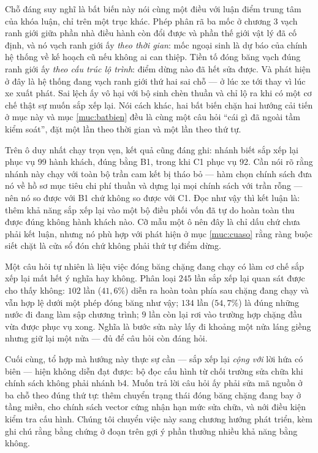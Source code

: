 Chỗ đáng suy nghĩ là bất biến này nói cùng một điều với luận điểm trung tâm của khóa luận, chỉ
trên một trục khác. Phép phân rã ba mốc ở chương 3 vạch ranh giới giữa phần nhà điều hành còn
đổi được và phần thế giới vật lý đã cố định, và nó vạch ranh giới ấy \emph{theo thời gian}: mốc
ngoại sinh là dự báo của chính hệ thống về kế hoạch cũ nếu không ai can thiệp. Tiền tố đóng băng vạch
đúng ranh giới ấy \emph{theo cấu trúc lộ trình}: điểm dừng nào đã hết sửa được. Và phát hiện ở
đây là hệ thống đang vạch ranh giới thứ hai sai chỗ --- ở lúc xe tới thay vì lúc xe xuất phát.
Sai lệch ấy vô hại với bộ sinh chèn thuần và chỉ lộ ra khi có một cơ chế thật sự muốn sắp xếp
lại. Nói cách khác, hai bất biến chặn hai hướng cải tiến ở mục này và mục \ref{muc:batbien} đều
là cùng một câu hỏi ``cái gì đã ngoài tầm kiểm soát'', đặt một lần theo thời gian và một lần
theo thứ tự.

Trên ô duy nhất chạy trọn vẹn, kết quả cũng đáng ghi: nhánh biết sắp xếp lại phục vụ 99 hành
khách, đúng bằng B1, trong khi C1 phục vụ 92. Cần nói rõ rằng nhánh này chạy với toàn bộ trần
cam kết bị tháo bỏ --- hàm chọn chính sách đưa nó về hồ sơ mục tiêu chi phí thuần và dựng lại
mọi chính sách với trần rỗng --- nên nó so được với B1 chứ không so được với C1. Đọc như vậy thì
kết luận là: thêm khả năng sắp xếp lại vào một bộ điều phối vốn đã tự do hoàn toàn thu được đúng
không hành khách nào. Cỡ mẫu một ô nên đây là chỉ dấu chứ chưa phải kết luận, nhưng nó phù hợp
với phát hiện ở mục \ref{muc:cuaso} rằng ràng buộc siết chặt là cửa sổ đón chứ không phải thứ tự
điểm dừng.

Một câu hỏi tự nhiên là liệu việc đóng băng chặng đang chạy có làm cơ chế sắp xếp lại mất hết ý
nghĩa hay không. Phân loại $245$ lần sắp xếp lại quan sát được cho thấy không: $102$ lần
($41{,}6\%$) diễn ra hoàn toàn phía sau chặng đang chạy và vẫn hợp lệ dưới một phép đóng băng
như vậy; $134$ lần ($54{,}7\%$) là đúng những nước đi đang làm sập chương trình; $9$ lần còn lại
rơi vào trường hợp chặng đầu vừa được phục vụ xong. Nghĩa là bước sửa này lấy đi khoảng một nửa
láng giềng nhưng giữ lại một nửa --- đủ để câu hỏi còn đáng hỏi.

Cuối cùng, tổ hợp mà hướng này thực sự cần --- sắp xếp lại \emph{cộng với} lời hứa có biên --- hiện
không diễn đạt được: bộ đọc cấu hình từ chối trường sửa chữa khi chính sách không phải nhánh
b4. Muốn trả lời câu hỏi ấy phải sửa mã nguồn ở ba chỗ theo đúng thứ tự: thêm chuyển trạng thái
đóng băng chặng đang bay ở tầng miền, cho chính sách vector cứng nhận hạn mức sửa chữa, và nới
điều kiện kiểm tra cấu hình. Chúng tôi chuyển việc này sang chương hướng phát triển, kèm ghi chú
rằng bằng chứng ở đoạn trên gợi ý phần thưởng nhiều khả năng bằng không.


